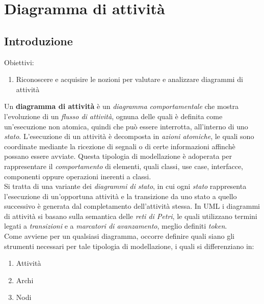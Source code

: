 \documentclass{article}
\begin{document}
\pagestyle{empty}

\section*{Diagramma di attività}
\large
\subsection*{Introduzione}
\large
Obiettivi:
\begin{enumerate}
    \renewcommand{\labelenumi}{-}
    \itemsep0em
    \item Riconoscere e acquisire le nozioni per valutare e analizzare diagrammi di attività
\end{enumerate}
Un \textbf{diagramma di attività} è un \textit{diagramma comportamentale} che mostra l'evoluzione di un \textit{flusso di attività}, ognuna delle quali è definita come un'esecuzione non atomica, quindi che può essere interrotta, all'interno di uno \textit{stato}. L'esecuzione di un attività è decomposta in \textit{azioni atomiche}, le quali sono coordinate mediante la ricezione di segnali o di certe informazioni affinchè possano essere avviate. Questa tipologia di modellazione è adoperata per rappresentare il \textit{comportamento} di elementi, quali classi, use case, interfacce, componenti oppure operazioni inerenti a classi.\vspace*{14pt}\\
Si tratta di una variante dei \textit{diagrammi di stato}, in cui ogni \textit{stato} rappresenta l'esecuzione di un'opportuna attività e la transizione da uno stato a quello successivo è generata dal completamento dell'attività stessa. In UML i diagrammi di attività si basano sulla semantica delle \textit{reti di Petri}, le quali utilizzano termini legati a \textit{transizioni} e a \textit{marcatori di avanzamento}, meglio definiti \textit{token}.\vspace*{14pt}\\
Come avviene per un qualsiasi diagramma, occorre definire quali siano gli strumenti necessari per tale tipologia di modellazione, i quali si differenziano in:
\begin{enumerate}
    \renewcommand{\labelenumi}{-}
    \itemsep0em
    \item Attività
    \item Archi 
    \item Nodi
\end{enumerate}
\end{document}
